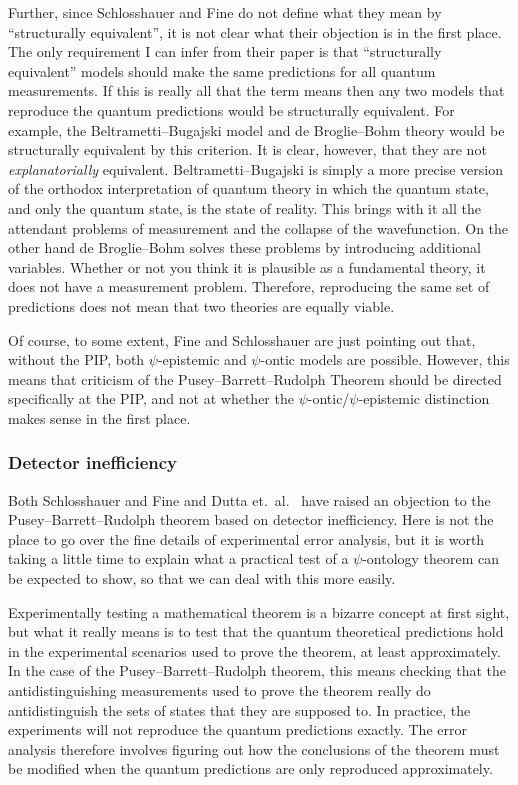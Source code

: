 \documentclass[DIV=calc,paper=a4,fontsize=11pt,twocolumn]{scrartcl} %
\theoremstyle{definition}
\theoremstyle{plain}
\begin{document}
Further, since Schlosshauer and Fine do not define what they mean by
``structurally equivalent'', it is not clear what their objection is
in the first place.  The only requirement I can infer from their paper
is that ``structurally equivalent'' models should make the same
predictions for all quantum measurements.  If this is really all that
the term means then any two models that reproduce the quantum
predictions would be structurally equivalent.  For example, the
Beltrametti--Bugajski model and de Broglie--Bohm theory would be
structurally equivalent by this criterion.  It is clear, however, that
they are not \emph{explanatorially} equivalent.  Beltrametti--Bugajski
is simply a more precise version of the orthodox interpretation of
quantum theory in which the quantum state, and only the quantum state,
is the state of reality.  This brings with it all the attendant
problems of measurement and the collapse of the wavefunction.  On the
other hand de Broglie--Bohm solves these problems by introducing
additional variables.  Whether or not you think it is plausible as a
fundamental theory, it does not have a measurement problem.
Therefore, reproducing the same set of predictions does not mean that
two theories are equally viable.

Of course, to some extent, Fine and Schlosshauer are just pointing out
that, without the PIP, both $\psi$-epistemic and $\psi$-ontic models
are possible.  However, this means that criticism of the Pusey--Barrett--Rudolph Theorem
should be directed specifically at the PIP, and not at whether the
$\psi$-ontic/$\psi$-epistemic distinction makes sense in the first
place.

\subsubsection{Detector inefficiency}

\label{Crit:SF2}

Both Schlosshauer and Fine \cite{Schlosshauer2012} and Dutta et.\ al.\
\cite{Dutta2014} have raised an objection to the Pusey--Barrett--Rudolph theorem based on
detector inefficiency.  Here is not the place to go over the fine
details of experimental error analysis, but it is worth taking a
little time to explain what a practical test of a $\psi$-ontology
theorem can be expected to show, so that we can deal with this more
easily.

Experimentally testing a mathematical theorem is a bizarre concept at
first sight, but what it really means is to test that the quantum
theoretical predictions hold in the experimental scenarios used to
prove the theorem, at least approximately.  In the case of the Pusey--Barrett--Rudolph
theorem, this means checking that the antidistinguishing measurements
used to prove the theorem really do antidistinguish the sets of states
that they are supposed to.  In practice, the experiments will not
reproduce the quantum predictions exactly.  The error analysis
therefore involves figuring out how the conclusions of the theorem
must be modified when the quantum predictions are only reproduced
approximately.
\end{document}
